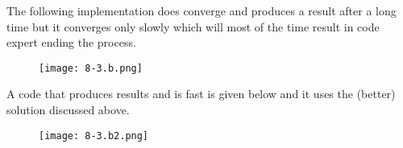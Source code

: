 \documentclass{article}
\begin{document}
\pagebreak

\noindent The following implementation does converge and produces a result after a long time but it converges only slowly which will most of the time result in code expert ending the process.

\begin{figure}[!hbt]
    \centering
\texttt{[image: 8-3.b.png]}
\end{figure}

\noindent A code that produces results and is fast is given below and it uses the (better) solution discussed above.

\begin{figure}[!hbt]
    \centering
\texttt{[image: 8-3.b2.png]}
\end{figure}
\end{document}
